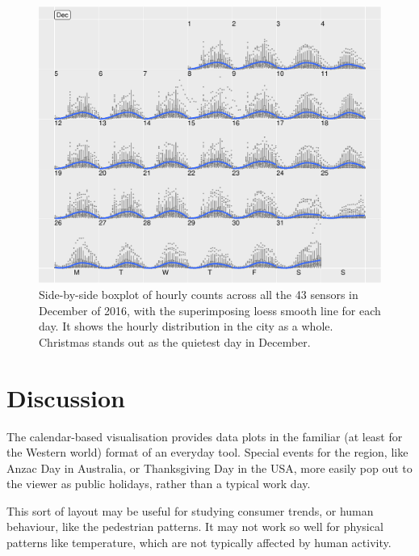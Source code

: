 \documentclass[article]{jss}
\begin{document}
\begin{CodeChunk}
\begin{figure}

{\centering \includegraphics[width=\textwidth]{figure/boxplot-1} 

}

\caption[Side-by-side boxplot of hourly counts across all the 43 sensors in December of 2016, with the superimposing loess smooth line for each day]{Side-by-side boxplot of hourly counts across all the 43 sensors in December of 2016, with the superimposing loess smooth line for each day. It shows the hourly distribution in the city as a whole. Christmas stands out as the quietest day in December.}\label{fig:boxplot}
\end{figure}
\end{CodeChunk}

\section{Discussion}\label{discussion}

\label{sec:discussion}

The calendar-based visualisation provides data plots in the familiar (at
least for the Western world) format of an everyday tool. Special events
for the region, like Anzac Day in Australia, or Thanksgiving Day in the
USA, more easily pop out to the viewer as public holidays, rather than a
typical work day.

This sort of layout may be useful for studying consumer trends, or human
behaviour, like the pedestrian patterns. It may not work so well for
physical patterns like temperature, which are not typically affected by
human activity.


\end{document}
